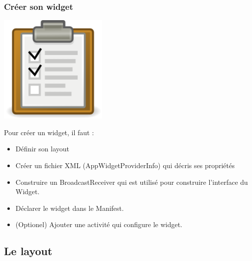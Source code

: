 \documentclass{beamer}
\begin{document}
\begin{frame}
\frametitle{Créer son widget}
\begin{center}
\includegraphics[scale=0.25]{todolist.png}
\end{center}
\begin{block}{Pour créer un widget, il faut :}
\begin{itemize}
\item Définir son layout
\item Créer un fichier XML (AppWidgetProviderInfo) qui décris ses propriétés
\item Construire un BroadcastReceiver qui est utilisé pour construire l'interface du Widget.
\item Déclarer le widget dans le Manifest.
\item (Optionel) Ajouter une activité qui configure le widget.
\end{itemize}
\end{block}

\end{frame}

\subsection{Le layout}
\end{document}
